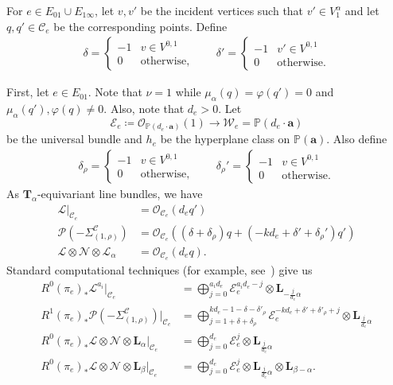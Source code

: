 \documentclass{amsart}
\theoremstyle{definition}
\theoremstyle{remark}
\theoremstyle{plain}
\theoremstyle{definition}
\theoremstyle{remark}
\newcommand{\T}{\mathbf{T}}
\renewcommand{\P}{\mathbb{P}}
\newcommand{\ba}{\mathbf{a}}
\newcommand{\mc}[1]{\mathcal{#1}}
\newcommand{\mbf}[1]{\mathbf{#1}}
\newcommand{\1}{\mathbf{1}}
\newcommand{\2}{\mathbf{2}}
\newcommand{\3}{\mathbf{3}}
\begin{document}
For $e \in E_{01} \cup E_{1\infty}$, let $v, v'$ be the incident vertices such that $v' \in V_1^{\alpha}$ and let $q, q' \in \mc{C}_e$ be the corresponding points. Define
\begin{align*}
    \delta = \begin{cases}
        -1 & v \in V^{0,1} \\
        0 & \text{otherwise},
    \end{cases} \qquad
    \delta' = \begin{cases}
        -1 & v' \in V^{0,1} \\
        0 & \text{otherwise}.
    \end{cases}
\end{align*}


First, let $e \in E_{01}$. Note that $\nu = 1$ while $\mu_{\alpha}(q) = \varphi(q') = 0$ and $\mu_{\alpha}(q'), \varphi(q) \neq 0$. Also, note that $d_e > 0$. Let
\[ \mc{E}_e \coloneqq \mc{O}_{\P(d_e \cdot \ba)}(1) \to \mc{W}_e = \P(d_e \cdot \ba) \]
be the universal bundle and $h_e$ be the hyperplane class on $\P(\ba)$. Also define
\begin{align*}
    \delta_{\rho} = \begin{cases}
        -1 & v \in V^{0,1} \\
        0 & \text{otherwise},
    \end{cases} \qquad
    \delta_{\rho}' = \begin{cases}
        -1 & v \in V^{0,1} \\
        0 & \text{otherwise}.
    \end{cases}
\end{align*}
As $\T_{\alpha}$-equivariant line bundles, we have
\begin{align*}
    \mc{L}|_{\mc{C}_e} &= \mc{O}_{\mc{C}_e}(d_e q') \\
    \mc{P}(-\Sigma_{(1,\rho)}^{\mc{C}}) &= \mc{O}_{\mc{C}_e}((\delta + \delta_{\rho}) q + (-k d_e + \delta' + \delta_{\rho}')q') \\
    \mc{L} \otimes \mc{N} \otimes \mc{L}_{\alpha} &= \mc{O}_{\mc{C}_e}(d_e q).
\end{align*}
Standard computational techniques (for example, see~\cite[Example 98]{localization}) give us
\begin{align*}
    R^0 (\pi_e)_* \mc{L}^{a_i}|_{\mc{C}_e} &= \bigoplus_{j=0}^{a_i d_e} \mc{E}_e^{a_i d_e - j} \otimes \mbf{L}_{-\frac{j}{d_e} \alpha} \\
    R^1 (\pi_e)_* \mc{P}(-\Sigma_{(1,\rho)}^{\mc{C}})|_{\mc{C}_e} &= \bigoplus_{j=1+\delta+\delta_{\rho}}^{k d_e - 1 - \delta - \delta'_{\rho}} \mc{E}_e^{-kd_e + \delta' + \delta'_{\rho} + j} \otimes \mbf{L}_{\frac{j}{d_e} \alpha} \\
    R^0 (\pi_e)_* \mc{L} \otimes \mc{N} \otimes \mbf{L}_{\alpha} |_{\mc{C}_e} &= \bigoplus_{j=0}^{d_e} \mc{E}_e^j \otimes \mbf{L}_{\frac{j}{d_e} \alpha} \\
    R^0 (\pi_e)_* \mc{L} \otimes \mc{N} \otimes \mbf{L}_{\beta} |_{\mc{C}_e} &= \bigoplus_{j=0}^{d_e} \mc{E}_e^j \otimes \mbf{L}_{\frac{j}{d_e} \alpha} \otimes \mbf{L}_{\beta - \alpha}. 
\end{align*}
\end{document}
